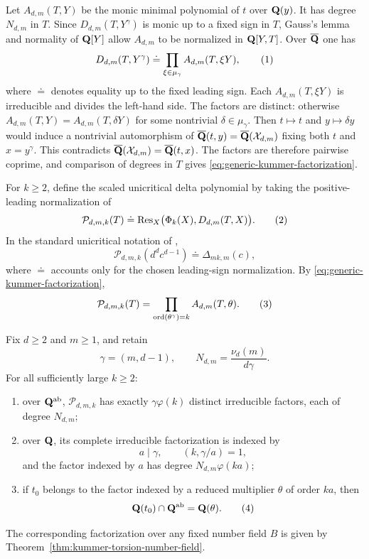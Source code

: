 Let $A_{d,m}(T,Y)$ be the monic minimal polynomial of $t$ over
$\mathbf Q(y)$.  It has degree $N_{d,m}$ in $T$.  Since
$D_{d,m}(T,Y^\gamma)$ is monic up to a fixed sign in $T$, Gauss's lemma and
normality of $\mathbf Q[Y]$ allow $A_{d,m}$ to be normalized in
$\mathbf Q[Y,T]$.  Over $\overline{\mathbf Q}$ one has
\[
 D_{d,m}(T,Y^\gamma)
 \doteq
 \prod_{\xi\in\mu_\gamma}A_{d,m}(T,\xi Y),
 \numberthis\label{eq:generic-kummer-factorization}
\]
where $\doteq$ denotes equality up to the fixed leading sign.  Each
$A_{d,m}(T,\xi Y)$ is irreducible and divides the left-hand side.  The
factors are distinct: otherwise
$A_{d,m}(T,Y)=A_{d,m}(T,\delta Y)$ for some nontrivial
$\delta\in\mu_\gamma$.  Then $t\mapsto t$ and $y\mapsto\delta y$ would
induce a nontrivial automorphism of
$\overline{\mathbf Q}(t,y)=\overline{\mathbf Q}(\mathcal X_{d,m})$ fixing both $t$ and
$x=y^\gamma$.  This contradicts
$\overline{\mathbf Q}(\mathcal X_{d,m})=\overline{\mathbf Q}(t,x)$.  The factors are
therefore pairwise coprime, and comparison of degrees in $T$ gives
\eqref{eq:generic-kummer-factorization}.

For $k\ge2$, define the scaled unicritical delta polynomial by taking
the positive-leading normalization of
\[
 \mathcal P_{d,m,k}(T)
 \doteq\Res_X\bigl(\Phi_k(X),D_{d,m}(T,X)\bigr).
 \numberthis\label{eq:scaled-delta}
\]
In the standard unicritical notation of
\cite[Theorem 1.1]{MurakamiSanoTakehira2024},
\[
 \mathcal P_{d,m,k}(d^dc^{d-1})\doteq\Delta_{mk,m}(c),
\]
where $\doteq$ accounts only for the chosen leading-sign
normalization.  By
\eqref{eq:generic-kummer-factorization},
\[
 \mathcal P_{d,m,k}(T)
 =\prod_{\ord(\theta^\gamma)=k}A_{d,m}(T,\theta).
 \numberthis\label{eq:scaled-delta-reduced-product}
\]

\begin{theorem}
\label{thm:unicritical-eventual-factorization}
Fix $d\ge2$ and $m\ge1$, and retain
\[
 \gamma=(m,d-1),\qquad
 N_{d,m}=\frac{\nu_d(m)}{d\gamma}.
\]
For all sufficiently large $k\ge2$:
\begin{enumerate}[label=\textup{(\roman*)}]
\item over $\mathbf Q^{\mathrm{ab}}$, $\mathcal P_{d,m,k}$ has exactly
      $\gamma\varphi(k)$ distinct irreducible factors, each of degree
      $N_{d,m}$;
\item over $\mathbf Q$, its complete irreducible factorization is indexed by
      \[
       a\mid\gamma,\qquad (k,\gamma/a)=1,
      \]
      and the factor indexed by $a$ has degree
      $N_{d,m}\varphi(ka)$;
\item if $t_0$ belongs to the factor indexed by a reduced multiplier
      $\theta$ of order $ka$, then
      \[
       \Q(t_0)\cap\Q^{\mathrm{ab}}=\Q(\theta).
       \numberthis\label{eq:unicritical-field-intersection}
      \]
\end{enumerate}
The corresponding factorization over any fixed number field $B$ is
given by Theorem~\ref{thm:kummer-torsion-number-field}.
\end{theorem}

